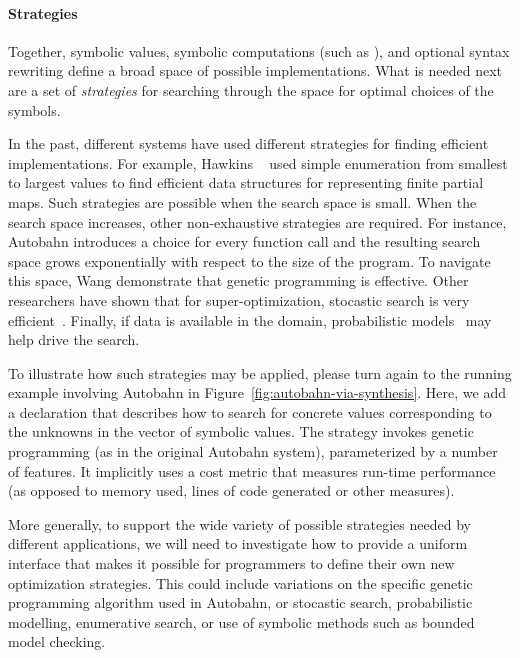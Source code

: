 \paragraph*{Strategies}
Together, symbolic values, symbolic computations (such as ),
and optional syntax rewriting define a broad space of possible
implementations.  What is needed next are a set of \emph{strategies}
for searching through the space for optimal choices of the symbols.

In the past, different systems have used different strategies for finding
efficient implementations.  For example, Hawkins \etal~\cite{data-rep-synth} used
simple enumeration from smallest to largest values to find efficient
data structures for representing finite partial maps.  Such strategies are
possible when the search space is small.  When the search space increases,
other non-exhaustive strategies are required.  For instance, Autobahn
introduces a choice for every function call and the resulting search
space grows exponentially with respect to the size of the program.  To
navigate this space, Wang \etal{} demonstrate that genetic programming is effective.
Other researchers have shown that for super-optimization, stocastic search is very
efficient~\cite{stochastic-superopt}.  Finally, if data is available in the domain, probabilistic
models~\cite{probabilistic-netkat} may help drive the search.

To illustrate how such strategies may be applied, please turn again to
the running example \rasp involving Autobahn in
Figure~\ref{fig:autobahn-via-synthesis}.  Here, we add a declaration
that describes how to search for concrete values corresponding to the
unknowns in the  vector of symbolic values.  The strategy
invokes genetic programming (as in the original Autobahn system),
parameterized by a number of features.  It implicitly uses a
cost metric that measures run-time performance (as opposed to memory used,
lines of code generated or other measures). 

More generally, to support the wide variety of possible strategies
needed by different applications, we will need to investigate how to
provide a uniform interface that makes it possible for programmers to
define their own new optimization strategies.  This could include
variations on the specific genetic programming algorithm used in
Autobahn, or stocastic search, probabilistic modelling, enumerative
search, or use of symbolic methods such as bounded model checking.

